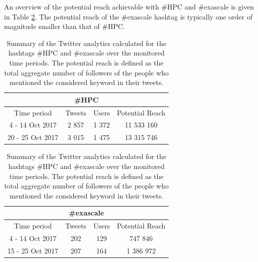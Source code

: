 An overview of the potential reach achievable with \#HPC and \#exascale is given in Table \ref{Summary_HPC-Exascale}. The potential reach of the \#exascale hashtag is typically one order of magnitude smaller than that of \#HPC.

\begin{table}[t]
 \begin{center}
 
  \begin{tabular}{cccc}
   \hline 
   \hline
   \multicolumn{4}{c}{\#HPC}\\
   \hline
   \hline
   Time period & Tweets & Users & Potential Reach \\ 
   \hline
   4 - 14 Oct 2017 & 2 857 & 1 372 & 11 533 160  \\
   20 - 25 Oct 2017 & 3 015 & 1 475 & 13 315 746  \\
   \hline
   \hline
  \end{tabular}

  \bigskip

  \begin{tabular}{cccc}
   \hline 
   \hline
   \multicolumn{4}{c}{\#exascale}\\
   \hline 
   \hline
   Time period & Tweets & Users & Potential Reach \\ 
   \hline
   4 - 14 Oct 2017 & 202 & 129 & 747 846 \\
   15 - 25 Oct 2017 & 207 & 164 & 1 386 972  \\
   \hline
   \hline
  \end{tabular}
 \end{center} 
 \caption{Summary of the Twitter analytics calculated for the hashtags \#HPC and \#exascale over the monitored time periods. The potential reach is defined as the total aggregate number of followers of the people who mentioned the considered keyword in their tweets.}
\label{Summary_HPC-Exascale} 
\end{table}    

